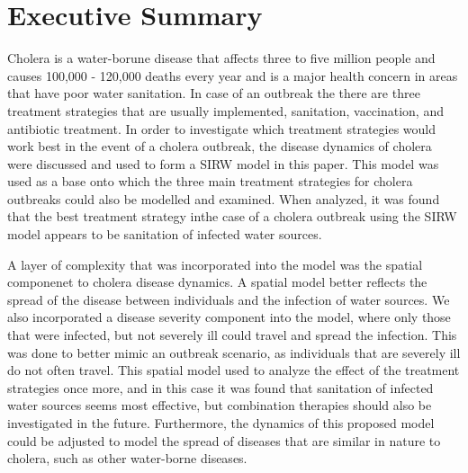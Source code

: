 \section{Executive Summary}
\par Cholera is a water-borune disease  that affects three to five million people and causes 100,000 - 120,000 deaths every year and is a major health concern in areas that have poor water sanitation. In case of an outbreak the there are three treatment strategies that are usually implemented, sanitation, vaccination, and antibiotic treatment. In order to investigate which treatment strategies would work best in the event of a cholera outbreak, the disease dynamics of cholera were discussed and used to form a SIRW model in this paper. This model was used as a base onto which the three main treatment strategies for cholera outbreaks could also be modelled and examined. When analyzed, it was found that the best treatment strategy inthe case of a cholera outbreak using the SIRW model appears to be sanitation of infected water sources. 
\par A layer of complexity that was incorporated into the model was the spatial componenet to cholera disease dynamics. A spatial model better reflects the spread of the disease between individuals and the infection of water sources. We also incorporated a disease severity component into the model, where only those that were infected, but not severely ill could travel and spread the infection. This was done to better mimic an outbreak scenario, as individuals that are severely ill do not often travel. This spatial model used to analyze the effect of the treatment strategies once more, and in this case it was found that sanitation of infected water sources seems most effective, but combination therapies should also be investigated in the future. Furthermore, the dynamics of this proposed model could be adjusted to model the spread of diseases that are similar in nature to cholera, such as other water-borne diseases.
